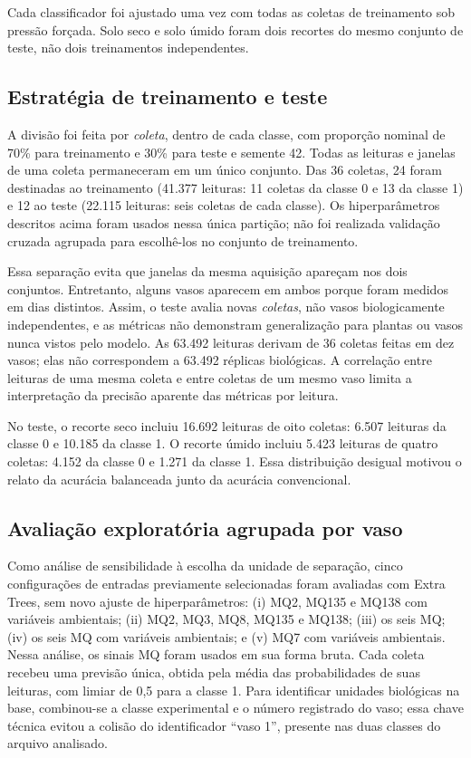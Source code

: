 Cada classificador foi ajustado uma vez com todas as coletas de treinamento
sob pressão forçada. Solo seco e solo úmido foram dois recortes do mesmo
conjunto de teste, não dois treinamentos independentes.

\subsection{Estratégia de treinamento e teste}
\label{subsec:treinamento_teste}

A divisão foi feita por \emph{coleta}, dentro de cada classe, com
proporção nominal de 70\% para treinamento e 30\% para teste e semente 42.
Todas as leituras e janelas de uma coleta permaneceram em um único conjunto.
Das 36 coletas, 24 foram destinadas ao treinamento (41.377 leituras: 11
coletas da classe 0 e 13 da classe 1) e 12 ao teste (22.115 leituras:
seis coletas de cada classe).
Os hiperparâmetros descritos acima foram usados nessa única partição;
não foi realizada validação cruzada agrupada para escolhê-los no conjunto
de treinamento.

Essa separação evita que janelas da mesma aquisição apareçam nos dois
conjuntos. Entretanto, alguns vasos aparecem em ambos porque foram medidos
em dias distintos. Assim, o teste avalia novas \emph{coletas}, não vasos
biologicamente independentes, e as métricas não demonstram generalização
para plantas ou vasos nunca vistos pelo modelo.
As 63.492 leituras derivam de 36 coletas feitas em dez vasos; elas não
correspondem a 63.492 réplicas biológicas. A correlação entre leituras de
uma mesma coleta e entre coletas de um mesmo vaso limita a interpretação
da precisão aparente das métricas por leitura.

No teste, o recorte seco incluiu 16.692 leituras de oito coletas: 6.507
leituras da classe 0 e 10.185 da classe 1. O recorte úmido incluiu 5.423
leituras de quatro coletas: 4.152 da classe 0 e 1.271 da classe 1. Essa
distribuição desigual motivou o relato da acurácia balanceada junto da
acurácia convencional.

\subsection{Avaliação exploratória agrupada por vaso}
\label{subsec:validacao_vaso}

Como análise de sensibilidade à escolha da unidade de separação, cinco
configurações de entradas previamente selecionadas foram avaliadas com
Extra Trees, sem novo ajuste de hiperparâmetros: (i) MQ2, MQ135 e MQ138
com variáveis ambientais; (ii) MQ2, MQ3, MQ8, MQ135 e MQ138; (iii) os seis
MQ; (iv) os seis MQ com variáveis ambientais; e (v) MQ7 com variáveis
ambientais. Nessa análise, os sinais MQ foram usados em sua forma bruta.
Cada coleta recebeu uma previsão única, obtida pela média das
probabilidades de suas leituras, com limiar de 0,5 para a classe 1. Para
identificar unidades biológicas na base, combinou-se a classe experimental
e o número registrado do vaso; essa chave técnica evitou a colisão do
identificador ``vaso 1'', presente nas duas classes do arquivo analisado.

